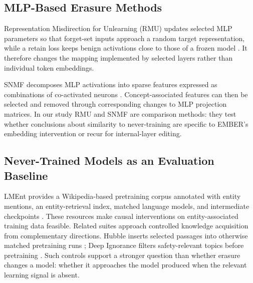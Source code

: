 \subsection{MLP-Based Erasure Methods}

Representation Misdirection for Unlearning (RMU) updates selected MLP
parameters so that forget-set inputs approach a random target representation,
while a retain loss keeps benign activations close to those of a frozen model
\citep{li2024wmdp}. It therefore changes the mapping implemented by selected
layers rather than individual token embeddings.

SNMF decomposes MLP activations into sparse features expressed as combinations
of co-activated neurons \citep{shafran2026snmf}. Concept-associated features
can then be selected and removed through corresponding changes to MLP
projection matrices. In our study RMU and SNMF are comparison methods: they test
whether conclusions about similarity to never-training are specific to EMBER's
embedding intervention or recur for internal-layer editing.

\subsection{Never-Trained Models as an Evaluation Baseline}

LMEnt provides a Wikipedia-based pretraining corpus annotated with entity
mentions, an entity-retrieval index, matched language models, and intermediate
checkpoints \citep{gottesman2025lment}. These resources make causal
interventions on entity-associated training data feasible. Related suites
approach controlled knowledge acquisition from complementary directions.
Hubble inserts selected passages into otherwise matched pretraining runs
\citep{wei2025hubble}; Deep Ignorance filters safety-relevant topics before
pretraining \citep{obrien2025deepignorance}. Such controls support a stronger
question than whether erasure changes a model: whether it approaches the model
produced when the relevant learning signal is absent.
